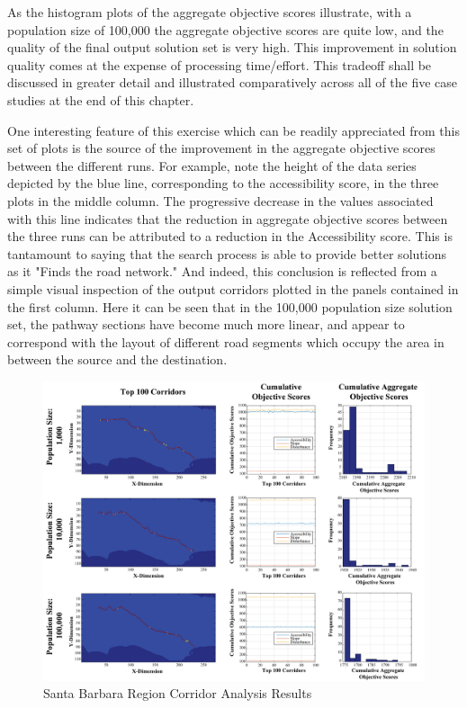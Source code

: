 As the histogram plots of the aggregate objective scores illustrate, with a population size of 100,000 the aggregate objective scores are quite low, and the quality of the final output solution set is very high. This improvement in solution quality comes at the expense of processing time/effort. This tradeoff shall be discussed in greater detail and illustrated comparatively across all of the five case studies at the end of this chapter. 

One interesting feature of this exercise which can be readily appreciated from this set of plots is the source of the improvement in the aggregate objective scores between the different runs. For example, note the height of the data series depicted by the blue line, corresponding to the accessibility score, in the three plots in the middle column. The progressive decrease in the values associated with this line indicates that the reduction in aggregate objective scores between the three runs can be attributed to a reduction in the Accessibility score. This is tantamount to saying that the search process is able to provide better solutions as it "Finds the road network." And indeed, this conclusion is reflected from a simple visual inspection of the output corridors plotted in the panels contained in the first column. Here it can be seen that in the 100,000 population size solution set, the pathway sections have become much more linear, and appear to correspond with the layout of different road segments which occupy the area in between the source and the destination. 
    
        \begin{figure}[!h]
            \begin{center}
            \includegraphics[width=6in]{figures/SantaBarbara_PathwayResults.png}   
            \caption{Santa Barbara Region Corridor Analysis Results}
            \label{fig:SBresults}
            \end{center}
        \end{figure}
        
